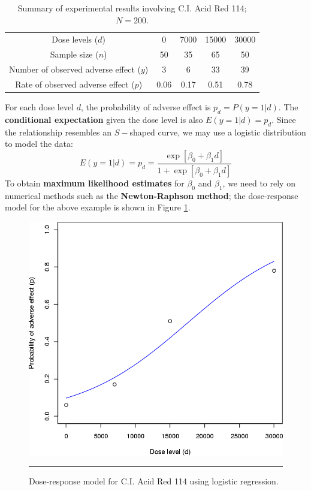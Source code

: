      \begin{table}[!t]
         \centering
         \begin{tabular}{c c c c c}
         \hline
        Dose levels ($d$) & 0 & 7000 & 15000 & 30000\\
        Sample size ($n$) & 50 & 35 & 65 & 50\\
        Number of observed adverse effect ($y$) & 3 & 6 & 33 &39\\
        Rate of observed adverse effect ($p$) & 0.06 & 0.17 & 0.51 & 0.78\\
        \hline
         \end{tabular}
         \caption[\small Summary of experimental results involving C.I. Acid Red 114]{Summary of experimental results involving C.I. Acid Red 114; $N=200$.}
         \label{tab:SA8}
     \end{table}
For each dose level $d$, the probability of adverse effect is $p_{d}=P(y=1|d)$. The \textbf{conditional expectation} given the dose level is also $E(y=1|d)=p_{d}$. Since the relationship resembles an $S-$shaped curve, we may use a  logistic distribution to model the data:
\begin{equation*}
    E(y=1|d)=p_{d}=\frac{\exp[\beta_{0}+\beta_{1}d]}{1+\exp[\beta_{0}+\beta_{1}d]}
\end{equation*}
To obtain \textbf{maximum likelihood estimates} for $\beta_{0}$ and $\beta_{1}$, we need to rely on numerical methods such as the \textbf{Newton-Raphson method}; the dose-response model for the above example is shown in Figure \ref{fig:testA8}.

\begin{figure}[!t]
\centering
  \includegraphics[width=0.5\linewidth]{Images/testA8.png}
  \caption[\small Dose-response model for C.I. Acid Red 114 using logistic regression]{\small Dose-response model for C.I. Acid Red 114 using logistic regression.}
  \label{fig:testA8}\hrule
\end{figure}
